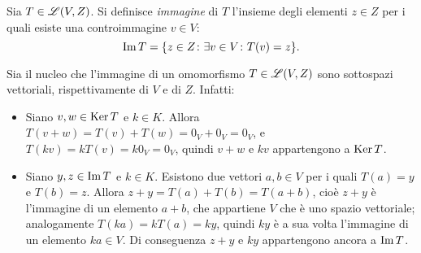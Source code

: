 \begin{definizione} \label{d:immagine-applicazione-lineare}
	Sia $T\in\mathscr L(V,Z)$.
	Si definisce \emph{immagine} di $T$ l'insieme degli elementi $  z\in Z$ per i quali esiste una controimmagine $  v\in V$:
	\begin{equation*}
		\operatorname{Im} T=\{  z\in Z\colon\exists   v\in V\colon T(  v)=  z\}.
	\end{equation*}
\end{definizione}
Sia il nucleo che l'immagine di un omomorfismo $T\in\mathscr L(V,Z)$ sono sottospazi vettoriali, rispettivamente di $V$ e di $Z$.
Infatti:
\begin{itemize}
	\item Siano $  v,  w\in\operatorname{Ker} T$ e $k\in K$.
		Allora $T(  v+  w)=T(  v)+T(  w)=0_V+0_V=0_V$, e $T(k  v)=kT(  v)=k0_V=0_V$, quindi $  v+  w$ e $k  v$ appartengono a $\operatorname{Ker} T$.
	\item Siano $  y,  z\in\operatorname{Im} T$ e $k\in K$.
		Esistono due vettori $  a,  b\in V$ per i quali $T(  a)=  y$ e $T(  b)=  z$.
		Allora $  z+  y=T(  a)+T(  b)=T(  a+  b)$, cioè $  z+  y$ è l'immagine di un elemento $  a+  b$, che appartiene $V$ che è uno spazio vettoriale; analogamente $T(k  a)=kT(  a)=k  y$, quindi $k  y$ è a sua volta l'immagine di un elemento $k  a\in V$.
		Di conseguenza $  z+  y$ e $k  y$ appartengono ancora a $\operatorname{Im} T$.
\end{itemize}

